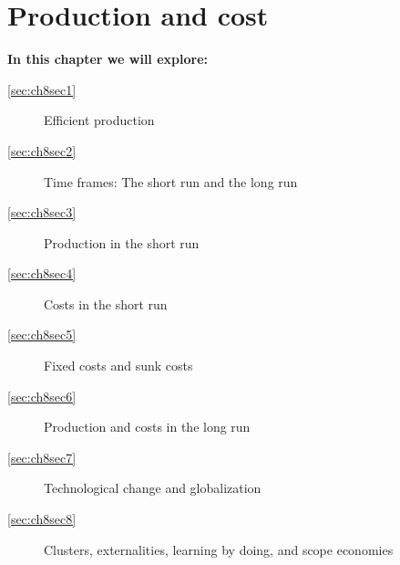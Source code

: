 \chapter{Production and cost}\label{chap:prodcost}

\begin{topics}
\textbf{In this chapter we will explore:}
\begin{description}
	\item[\ref{sec:ch8sec1}] Efficient production
	\item[\ref{sec:ch8sec2}] Time frames: The short run and the long run
	\item[\ref{sec:ch8sec3}] Production in the short run
	\item[\ref{sec:ch8sec4}] Costs in the short run
	\item[\ref{sec:ch8sec5}] Fixed costs and sunk costs
	\item[\ref{sec:ch8sec6}] Production and costs in the long run
	\item[\ref{sec:ch8sec7}] Technological change and globalization
	\item[\ref{sec:ch8sec8}] Clusters, externalities, learning by doing, and scope economies
\end{description}
\end{topics}